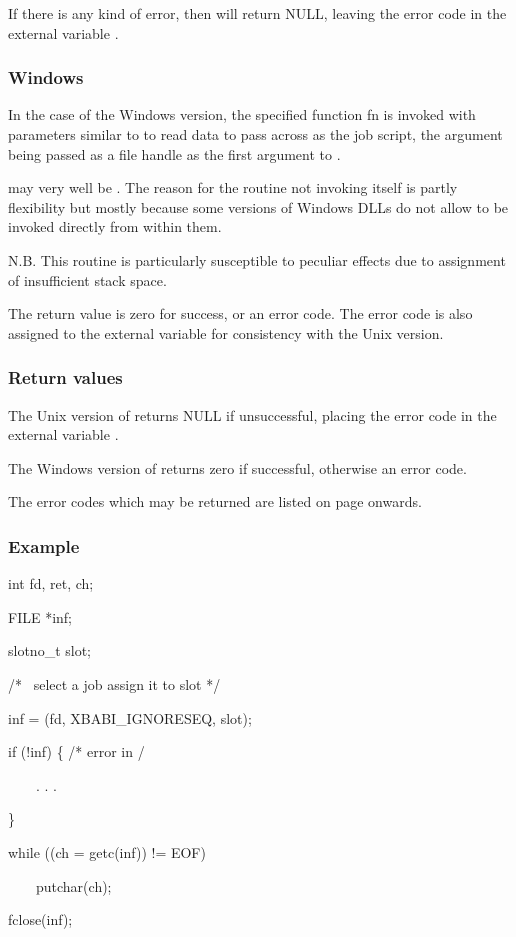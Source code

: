 If there is any kind of error, then \funcXBjobdata{} will return NULL, leaving the error code in the external variable
\filename{\errorloc}.

\subsubsection{Windows}
In the case of the Windows version, the specified function fn is invoked with parameters similar to  to read data to
pass across as the job script, the argument  being passed as a file handle as the
first argument to .

 may very well be . The reason for the routine not invoking 
itself is partly flexibility but mostly because some versions of Windows DLLs do not allow  to be invoked
directly from within them.

N.B. This routine is particularly susceptible to peculiar effects due to assignment of insufficient stack space.

The return value is zero for success, or an error code. The error code is also assigned to the external variable
\filename{\errorloc} for consistency with the Unix version.

\subsubsection{Return values}
The Unix version of \funcXBjobdata{} returns NULL if unsuccessful, placing the error code in the external variable
\filename{\errorloc}.

The Windows version of \funcXBjobdata{} returns zero if successful, otherwise an error code.

The error codes which may be returned are listed on page \pageref{errorcodes} onwards.

\subsubsection{Example}

\begin{expara}

int fd, ret, ch;

FILE *inf;

slotno\_t slot;

\bigskip


/* \ select a job assign it to slot */

\bigskip


inf = \funcnameXBjobdata{}(fd, XBABI\_IGNORESEQ, slot);

\bigskip


if (!inf) \{ /* error in \errorloc */

\ \ \ \ . . .

\}

\bigskip


while ((ch = getc(inf)) != EOF)

\ \ \ \ putchar(ch);

\bigskip


fclose(inf);

\end{expara}

